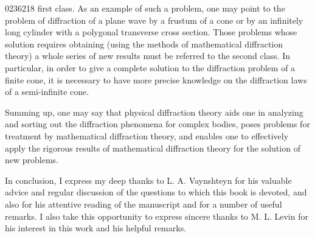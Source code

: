 \begin{scanpage}{0236}{218}
\noindent first class. As an example of such a problem, one may point to the problem of diffraction of a plane wave by a frustum of a cone or by an infinitely long cylinder with a polygonal transverse cross section. Those problems whose solution requires obtaining (using the methods of mathematical diffraction theory) a whole series of new results must be referred to the second class. In particular, in order to give a complete solution to the diffraction problem of a finite cone, it is necessary to have more precise knowledge on the diffraction laws of a semi-infinite cone.

Summing up, one may say that physical diffraction theory aids one in analyzing and sorting out the diffraction phenomena for complex bodies, poses problems for treatment by mathematical diffraction theory, and enables one to effectively apply the rigorous results of mathematical diffraction theory for the solution of new problems.

In conclusion, I express my deep thanks to L. A. Vaynshteyn for his valuable advice and regular discussion of the questions to which this book is devoted, and also for his attentive reading of the manuscript and for a number of useful remarks. I also take this opportunity to express sincere thanks to M. L. Levin for his interest in this work and his helpful remarks.
\end{scanpage}

